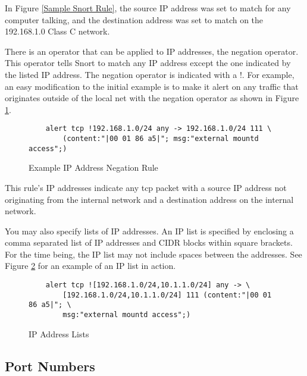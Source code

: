 \documentclass[english]{report}
\begin{document}
In Figure \ref{Sample Snort Rule}, the source IP address was set to match for
any computer talking, and the destination address was set to match on the
192.168.1.0 Class C network.

There is an operator that can be applied to IP addresses, the negation
operator. This operator tells Snort to match any IP address except the one
indicated by the listed IP address. The negation operator is indicated with a
!. For example, an easy modification to the initial example is to make it alert
on any traffic that originates outside of the local net with the negation
operator as shown in Figure \ref{Example Negation}.

\begin{center}
\begin{figure}
\begin{verbatim}
    alert tcp !192.168.1.0/24 any -> 192.168.1.0/24 111 \
        (content:"|00 01 86 a5|"; msg:"external mountd access";)
\end{verbatim}

\caption{\label{Example Negation} Example IP Address Negation Rule}
\end{figure}
\end{center}

This rule's IP addresses indicate any tcp packet with a source IP address not
originating from the internal network and a destination address on the internal
network.

You may also specify lists of IP addresses. An IP list is specified by
enclosing a comma separated list of IP addresses and CIDR blocks within square
brackets. For the time being, the IP list may not include spaces between the
addresses. See Figure \ref{IP list usage} for an example of an IP list in
action.

\begin{center}
\begin{figure}
\begin{verbatim}
    alert tcp ![192.168.1.0/24,10.1.1.0/24] any -> \
        [192.168.1.0/24,10.1.1.0/24] 111 (content:"|00 01 86 a5|"; \
        msg:"external mountd access";)
\end{verbatim}

\caption{\label{IP list usage}IP Address Lists}
\end{figure}
\end{center}

\subsection{Port Numbers}
\end{document}

